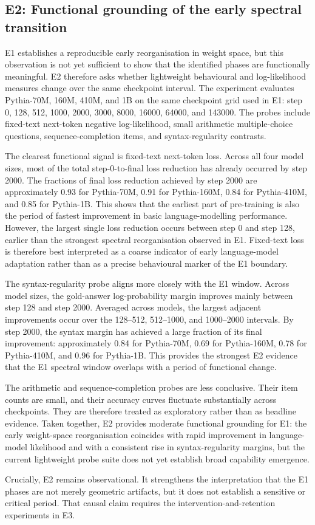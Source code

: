 

\subsection{E2: Functional grounding of the early spectral transition}
\label{sec:e2-functional-grounding}

E1 establishes a reproducible early reorganisation in weight space, but this observation is not yet sufficient to show that the identified phases are functionally meaningful. E2 therefore asks whether lightweight behavioural and log-likelihood measures change over the same checkpoint interval. The experiment evaluates Pythia-70M, 160M, 410M, and 1B on the same checkpoint grid used in E1: step 0, 128, 512, 1000, 2000, 3000, 8000, 16000, 64000, and 143000. The probes include fixed-text next-token negative log-likelihood, small arithmetic multiple-choice questions, sequence-completion items, and syntax-regularity contrasts.

The clearest functional signal is fixed-text next-token loss. Across all four model sizes, most of the total step-0-to-final loss reduction has already occurred by step 2000. The fractions of final loss reduction achieved by step 2000 are approximately 0.93 for Pythia-70M, 0.91 for Pythia-160M, 0.84 for Pythia-410M, and 0.85 for Pythia-1B. This shows that the earliest part of pre-training is also the period of fastest improvement in basic language-modelling performance. However, the largest single loss reduction occurs between step 0 and step 128, earlier than the strongest spectral reorganisation observed in E1. Fixed-text loss is therefore best interpreted as a coarse indicator of early language-model adaptation rather than as a precise behavioural marker of the E1 boundary.

The syntax-regularity probe aligns more closely with the E1 window. Across model sizes, the gold-answer log-probability margin improves mainly between step 128 and step 2000. Averaged across models, the largest adjacent improvements occur over the 128--512, 512--1000, and 1000--2000 intervals. By step 2000, the syntax margin has achieved a large fraction of its final improvement: approximately 0.84 for Pythia-70M, 0.69 for Pythia-160M, 0.78 for Pythia-410M, and 0.96 for Pythia-1B. This provides the strongest E2 evidence that the E1 spectral window overlaps with a period of functional change.

The arithmetic and sequence-completion probes are less conclusive. Their item counts are small, and their accuracy curves fluctuate substantially across checkpoints. They are therefore treated as exploratory rather than as headline evidence. Taken together, E2 provides moderate functional grounding for E1: the early weight-space reorganisation coincides with rapid improvement in language-model likelihood and with a consistent rise in syntax-regularity margins, but the current lightweight probe suite does not yet establish broad capability emergence.

Crucially, E2 remains observational. It strengthens the interpretation that the E1 phases are not merely geometric artifacts, but it does not establish a sensitive or critical period. That causal claim requires the intervention-and-retention experiments in E3.
